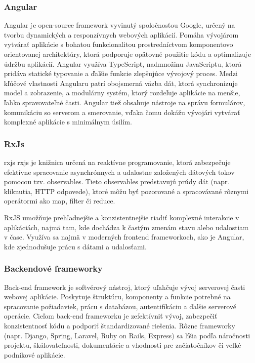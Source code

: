\subsubsection{Angular}
Angular je open-source framework vyvinutý spoločnosťou Google, určený na tvorbu dynamických a responzívnych webových aplikácií.
Pomáha vývojárom vytvárať aplikácie s bohatou funkcionalitou prostredníctvom komponentovo orientovanej architektúry, ktorá podporuje opätovné použitie kódu a optimalizuje údržbu aplikácií.
Angular využíva TypeScript, nadmnožinu JavaScriptu, ktorá pridáva statické typovanie a ďalšie funkcie zlepšujúce vývojový proces. 
Medzi kľúčové vlastnosti Angularu patrí obojsmerná väzba dát, ktorá synchronizuje model a zobrazenie, a modulárny systém, ktorý rozdeľuje aplikácie na menšie, ľahko spravovateľné časti.
Angular tiež obsahuje nástroje na správu formulárov, komunikáciu so serverom a smerovanie, vďaka čomu dokážu vývojári vytvárať komplexné aplikácie s minimálnym úsilím. \cite{angular}

\subsubsection{RxJs}
\acrshort{rxjs} \acrfull{rxjs} je knižnica určená na reaktívne programovanie, ktorá zabezpečuje efektívne spracovanie asynchrónnych a udalostne založených dátových tokov pomocou tzv. observables. 
Tieto observables predstavujú prúdy dát (napr. kliknutia, HTTP odpovede), ktoré môžu byť pozorované a spracovávané rôznymi operátormi ako map, filter či reduce.

RxJS umožňuje prehľadnejšie a konzistentnejšie riadiť komplexné interakcie v aplikáciách, najmä tam, kde dochádza k častým zmenám stavu alebo udalostiam v čase.
Využíva sa najmä v moderných frontend frameworkoch, ako je Angular, kde zjednodušuje prácu s dátami a udalosťami.\cite{rxjs}\cite{aipreklad}
\subsubsection{Backendové frameworky}
Back-end framework je softvérový nástroj, ktorý uľahčuje vývoj serverovej časti webovej aplikácie. 
Poskytuje štruktúru, komponenty a funkcie potrebné na spracovanie požiadaviek, prácu s databázou, autentifikáciu a ďalšie serverové operácie. 
Cieľom back-end frameworku je zefektívniť vývoj, zabezpečiť konzistentnosť kódu a podporiť štandardizované riešenia. 
Rôzne frameworky (napr. Django, Spring, Laravel, Ruby on Rails, Express) sa líšia podľa náročnosti projektu, škálovateľnosti, dokumentácie a vhodnosti pre začiatočníkov či veľké podnikové aplikácie.\cite{backendframework}\cite{aipreklad}

